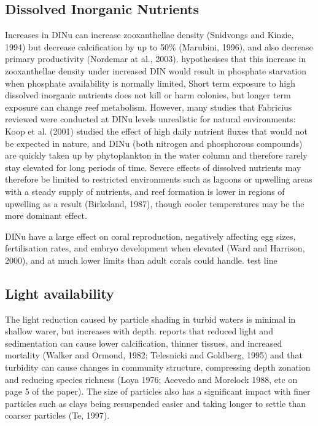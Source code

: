 \documentclass[11pt,a4paper]{article}
\begin{document}
\subsection{Dissolved Inorganic Nutrients}

Increases in DINu can increase zooxanthellae density (Snidvongs and Kinzie, 1994) but decrease calcification by up to 50\% (Marubini, 1996), and also decrease primary productivity (Nordemar at al., 2003).
 \cite{Wiedemann2013} hypothesises that this increase in zooxanthellae density under increased DIN would result in phosphate starvation when phosphate availability is normally limited, 
 Short term exposure to high dissolved inorganic nutrients does not kill or harm colonies, but longer term exposure can change reef metabolism.
  However, many studies that Fabricius reviewed were conducted at DINu levels unrealistic for natural environments: Koop et al. (2001) studied the effect of high daily nutrient fluxes that would not be expected in nature, and DINu (both nitrogen and phosphorous compounds) are quickly taken up by phytoplankton in the water column and therefore rarely stay elevated for long periods of time.
 Severe effects of dissolved nutrients may therefore be limited to restricted environments such as lagoons or upwelling areas with a steady supply of nutrients, and reef formation is lower in regions of upwelling as a result (Birkeland, 1987), though cooler temperatures may be the more dominant effect.

DINu have a large effect on coral reproduction, negatively affecting egg sizes, fertilisation rates, and embryo development when elevated (Ward and Harrison, 2000), and at much lower limits than adult corals could handle.
test line

\subsection{Light availability}

The light reduction caused by particle shading in turbid waters is minimal in shallow warer, but increases with depth.
 \cite{Fabricius2005} reports that reduced light and sedimentation can cause lower calcification, thinner tissues, and increased mortality (Walker and Ormond, 1982; Telesnicki and Goldberg, 1995) and that turbidity can cause changes in community structure, compressing depth zonation and reducing species richness (Loya 1976; Acevedo and Morelock 1988, etc on page 5 of the paper).
  The size of particles also has a significant impact with finer particles such as clays being resuspended easier and taking longer to settle than coarser particles (Te, 1997). 
\end{document}
